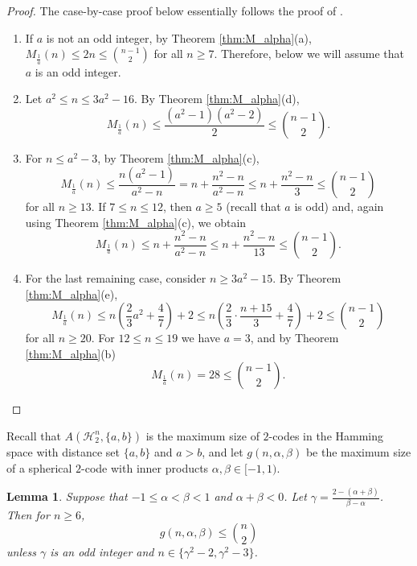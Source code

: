 \documentclass{amsart}
\newtheorem{lemmaenv}[definitionenv]{Lemma}
\newenvironment{lemma}{\begin{lemmaenv}\rm}{\end{lemmaenv}}
\newcommand{\cH}{\mathcal{H}}
\begin{document}
\begin{proof}
The case-by-case proof below essentially follows the proof of \cite[Theorem 2]{GY18}.
\begin{enumerate}
\item
If $a$ is not an odd integer, by Theorem \ref{thm:M_alpha}(a), $M_{\frac 1 a}(n) \leq 2n \leq \binom{n-1}{2}$ for all $n\geq 7$. Therefore,
below we
will assume that $a$ is an odd integer.
\item
Let $a^{2} \leq n \leq 3a^{2}-16.$ By Theorem \ref{thm:M_alpha}(d), 
\begin{equation*}
    M_{\frac 1 a}(n) \leq \frac{(a^{2}-1)(a^{2}-2)}{2} \leq \binom{n-1}{2}.
\end{equation*}
\item
For $n \leq a^{2}-3$, by Theorem \ref{thm:M_alpha}(c),
\begin{equation*}
    M_{\frac 1 a}(n) \leq \frac{n(a^{2}-1)}{a^{2}-n} = n + \frac{n^{2}-n}{a^{2}-n} \leq n+\frac{n^{2}-n}{3}\leq \binom{n-1}{2}
\end{equation*}
for all $n\geq 13$. If $7 \leq n \leq 12$, then $a \geq 5$ (recall that $a$ is odd) and, again using Theorem \ref{thm:M_alpha}(c), we obtain
\begin{equation*}
    M_{\frac 1 a}(n) \leq n + \frac{n^{2}-n}{a^{2}-n} \leq n + \frac{n^{2}-n}{13} \leq \binom{n-1}{2}.
\end{equation*}
\item
For the last remaining case, consider $n \geq 3a^{2}-15$. By Theorem \ref{thm:M_alpha}(e),
\begin{equation*}
    M_{\frac 1 a}(n) \leq n\left(\frac{2}{3}a^{2} + \frac{4}{7}\right) + 2 \leq n \left(\frac{2}{3} \cdot \frac{n+15}{3}+\frac{4}{7} \right)+2 \leq \binom{n-1}{2}
\end{equation*}
for all $n\geq 20$. For $12 \leq n \leq 19$ we have $a = 3$, and by Theorem \ref{thm:M_alpha}(b)
\begin{equation*}
    M_{\frac 1 a}(n) = 28 \leq \binom{n-1}{2}.
\end{equation*}

\end{enumerate}
\end{proof}

Recall that $A(\cH_{2}^{n}, \{a, b\})$ is the maximum size of $2$-codes in the Hamming space with distance set $\{a, b\}$ and $a > b$, and let $g(n, \alpha, \beta)$ be the maximum size of a spherical $2$-code with inner products $\alpha, \beta \in [-1, 1)$.

\begin{lemma}
\label{lem_sph}
Suppose that $-1 \leq \alpha < \beta < 1$ and $\alpha + \beta < 0$. Let $\gamma = \frac{2-(\alpha+\beta)}{\beta - \alpha}$. Then for $n\geq 6$,
\begin{equation*}
    g(n, \alpha, \beta) \leq \binom{n}{2}
\end{equation*}
unless $\gamma$ is an odd integer and $n \in \{\gamma^{2}-2, \gamma^{2}-3\}$.
\end{lemma}
\end{document}
